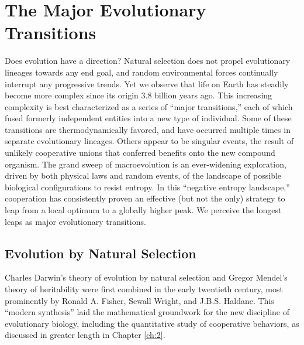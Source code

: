 \documentclass{tufte-book} %
\begin{document}
\chapter{The Major Evolutionary Transitions}\label{METs}

\begin{tcolorbox}[colback=gray!5!white,colframe=teal!75!black,title=Summary]%

    \parbox{\textwidth}{%
     Does evolution have a direction? Natural selection does not propel evolutionary lineages towards any end goal, and random environmental forces continually interrupt any progressive trends. Yet we observe that life on Earth has steadily become more complex since its origin 3.8 billion years ago. This increasing complexity is best characterized as a series of “major transitions,” each of which fused formerly independent entities into a new type of individual. Some of these transitions are thermodynamically favored, and have occurred multiple times in separate evolutionary lineages. Others appear to be singular events, the result of unlikely cooperative unions that conferred benefits onto the new compound organism. The grand sweep of macroevolution is an ever-widening exploration, driven by both physical laws and random events, of the landscape of possible biological configurations to resist entropy. In this “negative entropy landscape,” cooperation has consistently proven an effective (but not the only) strategy to leap from a local optimum to a globally higher peak. We perceive the longest leaps as major evolutionary transitions.
    }%
\end{tcolorbox}


\section{Evolution by Natural Selection}\label{evol-natsel}


Charles Darwin’s theory of evolution by natural selection and Gregor Mendel’s theory of heritability were first combined in the early twentieth century, most prominently by Ronald A. Fisher, Sewall Wright, and J.B.S. Haldane.\cite{darwin2009annotated, mendel1866versuche, fisher1958genetical, wright1931evolution, haldane1927mathematical} This “modern synthesis” laid the mathematical groundwork for the new discipline of evolutionary biology, including the quantitative study of cooperative behaviors, as discussed in greater length in Chapter \ref{ch:2}. 
    
\end{document}
